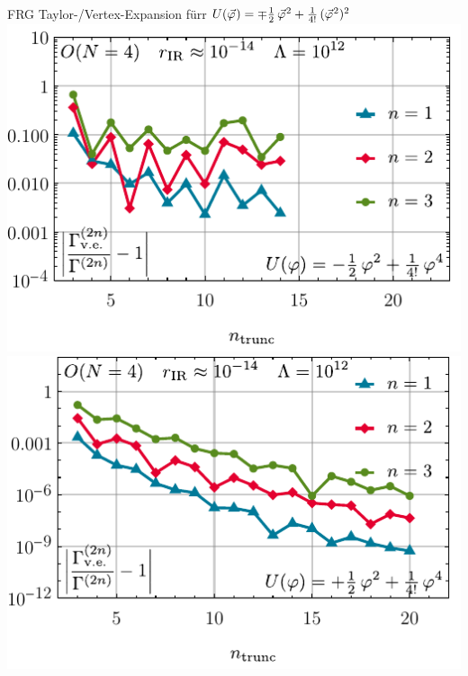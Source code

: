 \begin{frame}{FRG Taylor-/Vertex-Expansion fürr $	U ( \vec{\varphi} \mskip1.0mu ) = \mp\tfrac{1}{2} \, \vec{\varphi}^{\mskip1.0mu 2} + \tfrac{1}{4!} \, ( \vec{\varphi}^{\mskip1.0mu 2} )^2 $}
	\label{0dTaylor}
	\centering
	\includegraphics[width=0.47\framewidth]{../0d/figures/sc_ii_n_on_4_lambda_1e12_tir_60_vertex_exp_error.pdf}\hspace{.5cm}
	\includegraphics[width=0.47\framewidth]{../0d/figures/sc_ii_p_on_4_lambda_1e12_tir_60_vertex_exp_error.pdf} 
\end{frame}


